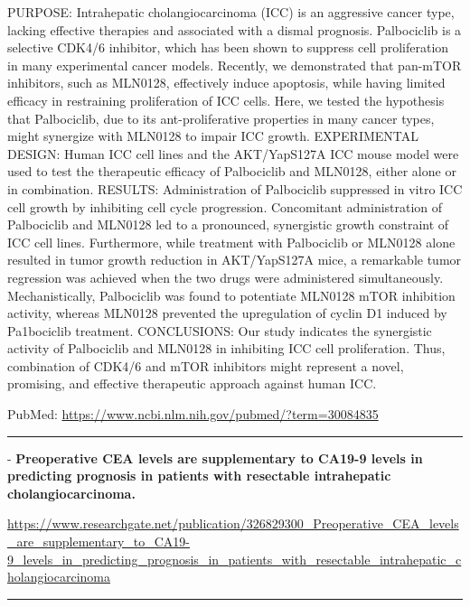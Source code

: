 \documentclass[]{article}
\begin{document}
PURPOSE: Intrahepatic cholangiocarcinoma (ICC) is an aggressive cancer
type, lacking effective therapies and associated with a dismal
prognosis. Palbociclib is a selective CDK4/6 inhibitor, which has been
shown to suppress cell proliferation in many experimental cancer models.
Recently, we demonstrated that pan-mTOR inhibitors, such as MLN0128,
effectively induce apoptosis, while having limited efficacy in
restraining proliferation of ICC cells. Here, we tested the hypothesis
that Palbociclib, due to its ant-proliferative properties in many cancer
types, might synergize with MLN0128 to impair ICC growth. EXPERIMENTAL
DESIGN: Human ICC cell lines and the AKT/YapS127A ICC mouse model were
used to test the therapeutic efficacy of Palbociclib and MLN0128, either
alone or in combination. RESULTS: Administration of Palbociclib
suppressed in vitro ICC cell growth by inhibiting cell cycle
progression. Concomitant administration of Palbociclib and MLN0128 led
to a pronounced, synergistic growth constraint of ICC cell lines.
Furthermore, while treatment with Palbociclib or MLN0128 alone resulted
in tumor growth reduction in AKT/YapS127A mice, a remarkable tumor
regression was achieved when the two drugs were administered
simultaneously. Mechanistically, Palbociclib was found to potentiate
MLN0128 mTOR inhibition activity, whereas MLN0128 prevented the
upregulation of cyclin D1 induced by Pa1bociclib treatment. CONCLUSIONS:
Our study indicates the synergistic activity of Palbociclib and MLN0128
in inhibiting ICC cell proliferation. Thus, combination of CDK4/6 and
mTOR inhibitors might represent a novel, promising, and effective
therapeutic approach against human ICC.

PubMed: \url{https://www.ncbi.nlm.nih.gov/pubmed/?term=30084835}

{}

{}

\begin{center}\rule{0.5\linewidth}{\linethickness}\end{center}

 - \textbf{Preoperative CEA levels are supplementary to CA19-9 levels in
predicting prognosis in patients with resectable intrahepatic
cholangiocarcinoma.}

\url{https://www.researchgate.net/publication/326829300_Preoperative_CEA_levels_are_supplementary_to_CA19-9_levels_in_predicting_prognosis_in_patients_with_resectable_intrahepatic_cholangiocarcinoma}

\begin{center}\rule{0.5\linewidth}{\linethickness}\end{center}
\end{document}
